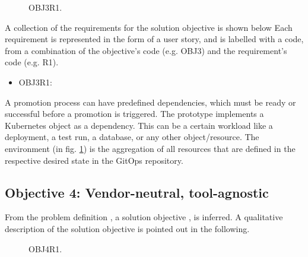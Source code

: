 \begin{figure}[h]
	\centering
	\caption{OBJ3R1.
	}
	\label{fig:OBJ3R1}	
\end{figure}

A collection of the requirements for the solution objective is shown below
Each requirement is represented in the form of a user story,
and is labelled with a code, from a combination of the
objective's code (e.g. OBJ3) and the requirement's code (e.g. R1).

\begin{itemize}
	\item OBJ3R1: 
\end{itemize}

A promotion process can have predefined dependencies, which must be ready or successful
before a promotion is triggered.
The prototype implements a Kubernetes object as a dependency. This can be a certain
workload like a deployment, a test run, a database, or any other object/resource.
The environment (in fig. \ref{fig:OBJ3R1}) is the aggregation of all resources
that are defined in the respective desired state in the GitOps repository.

\subsection{Objective 4: Vendor-neutral, tool-agnostic}
\label{objective4}

From the problem definition
,
a solution objective
,
is inferred.
A qualitative description of the solution objective
is pointed out in the following.

\begin{figure}[h]
	\centering
	\caption{OBJ4R1.
	}
	\label{fig:OBJ4R1}	
\end{figure}

